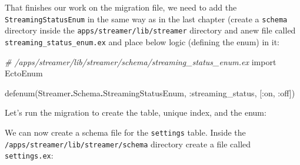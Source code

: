 \documentclass[
]{book}
\newenvironment{Shaded}{\begin{snugshade}}{\end{snugshade}}
\newcommand{\CommentTok}[1]{\textcolor[rgb]{0.56,0.35,0.01}{\textit{#1}}}
\newcommand{\ConstantTok}[1]{\textcolor[rgb]{0.00,0.00,0.00}{#1}}
\newcommand{\ExtensionTok}[1]{#1}
\newcommand{\ImportTok}[1]{#1}
\newcommand{\NormalTok}[1]{#1}
\newcommand{\OperatorTok}[1]{\textcolor[rgb]{0.81,0.36,0.00}{\textbf{#1}}}
\newcommand{\StringTok}[1]{\textcolor[rgb]{0.31,0.60,0.02}{#1}}
\newcommand{\VariableTok}[1]{\textcolor[rgb]{0.00,0.00,0.00}{#1}}
\begin{document}
That finishes our work on the migration file, we need to add the \texttt{StreamingStatusEnum} in the same way as in the last chapter (create a \texttt{schema} directory inside the \texttt{apps/streamer/lib/streamer} directory and anew file called \texttt{streaming\_status\_enum.ex} and place below logic (defining the enum) in it:

\begin{Shaded}
\begin{Highlighting}[]
\CommentTok{\# /apps/streamer/lib/streamer/schema/streaming\_status\_enum.ex}
\ImportTok{import} \ConstantTok{EctoEnum}

\NormalTok{defenum(}\ConstantTok{Streamer}\OperatorTok{.}\ConstantTok{Schema}\OperatorTok{.}\ConstantTok{StreamingStatusEnum}\NormalTok{, }\VariableTok{:streaming\_status}\NormalTok{, [}\VariableTok{:on}\NormalTok{, }\VariableTok{:off}\NormalTok{])}
\end{Highlighting}
\end{Shaded}

Let's run the migration to create the table, unique index, and the enum:

\begin{Shaded}
\end{Shaded}

We can now create a schema file for the \texttt{settings} table. Inside the \texttt{/apps/streamer/lib/streamer/schema} directory create a file called \texttt{settings.ex}:
\end{document}
